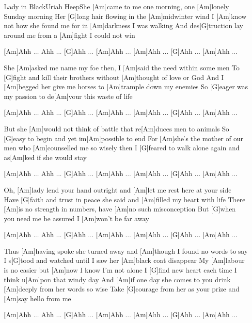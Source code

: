 \documentclass[../main.tex]{subfiles}
\begin{document}
\begin{song}{Lady in Black}{Uriah Heep}{}She [Am]came to me one morning, one [Am]lonely Sunday morning
Her [G]long hair flowing in the [Am]midwinter wind
I [Am]know not how she found me for in [Am]darkness I was walking
And des[G]truction lay around me from a [Am]fight I could not win

[Am]Ahh ... Ahh ... [G]Ahh ... [Am]Ahh ...
[Am]Ahh ... [G]Ahh ... [Am]Ahh ...

She [Am]asked me name my foe then, I [Am]said the need within some men
To [G]fight and kill their brothers without [Am]thought of love or God
And I [Am]begged her give me horses to [Am]trample down my enemies
So [G]eager was my passion to de[Am]vour this waste of life

[Am]Ahh ... Ahh ... [G]Ahh ... [Am]Ahh ...
[Am]Ahh ... [G]Ahh ... [Am]Ahh ...

But she [Am]would not think of battle that re[Am]duces men to animals
So [G]easy to begin and yet im[Am]possible to end
For [Am]she's the mother of our men who [Am]counselled me so wisely then
I [G]feared to walk alone again and as[Am]ked if she would stay

[Am]Ahh ... Ahh ... [G]Ahh ... [Am]Ahh ...
[Am]Ahh ... [G]Ahh ... [Am]Ahh ...

Oh, [Am]lady lend your hand outright and [Am]let me rest here at your side
Have [G]faith and trust in peace she said and [Am]filled my heart with life
There [Am]is no strength in numbers, have [Am]no such misconception
But [G]when you need me be assured I [Am]won't be far away

[Am]Ahh ... Ahh ... [G]Ahh ... [Am]Ahh ...
[Am]Ahh ... [G]Ahh ... [Am]Ahh ...

Thus [Am]having spoke she turned away and [Am]though I found no words to say
I s[G]tood and watched until I saw her [Am]black coat disappear
My [Am]labour is no easier but [Am]now I know I'm not alone
I [G]find new heart each time I think u[Am]pon that windy day
And [Am]if one day she comes to you drink [Am]deeply from her words so wise
Take [G]courage from her as your prize and [Am]say hello from me

[Am]Ahh ... Ahh ... [G]Ahh ... [Am]Ahh ...
[Am]Ahh ... [G]Ahh ... [Am]Ahh ...

\end{song}
\end{document}
